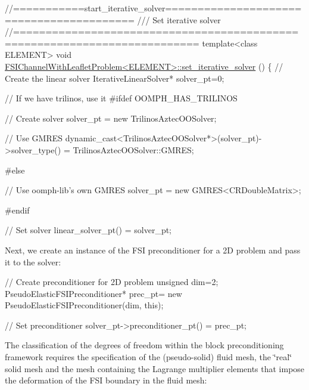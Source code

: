  
\begin{DoxyCodeInclude}
\textcolor{comment}{//===========start\_iterative\_solver=========================================}
\textcolor{comment}{/// Set iterative solver }
\textcolor{comment}{}\textcolor{comment}{//==========================================================================}
\textcolor{keyword}{template}<\textcolor{keyword}{class} ELEMENT>
\textcolor{keywordtype}{void} \hyperlink{classFSIChannelWithLeafletProblem_a8ca939c0edc4194e4e5cb7d1404f27de}{FSIChannelWithLeafletProblem<ELEMENT>::set\_iterative\_solver}
      ()
\{
 \textcolor{comment}{// Create the linear solver}
 IterativeLinearSolver* solver\_pt=0;
 
 \textcolor{comment}{// If we have trilinos, use it}
\textcolor{preprocessor}{#ifdef OOMPH\_HAS\_TRILINOS}
 
 \textcolor{comment}{// Create solver}
 solver\_pt = \textcolor{keyword}{new} TrilinosAztecOOSolver;
 
 \textcolor{comment}{// Use GMRES}
 \textcolor{keyword}{dynamic\_cast<}TrilinosAztecOOSolver*\textcolor{keyword}{>}(solver\_pt)->solver\_type() 
  = TrilinosAztecOOSolver::GMRES;
 
\textcolor{preprocessor}{#else}
 
 \textcolor{comment}{// Use oomph-lib's own GMRES}
 solver\_pt = \textcolor{keyword}{new} GMRES<CRDoubleMatrix>;
 
\textcolor{preprocessor}{#endif}

 \textcolor{comment}{// Set solver}
 linear\_solver\_pt() = solver\_pt;

\end{DoxyCodeInclude}


Next, we create an instance of the F\+SI preconditioner for a 2D problem and pass it to the solver\+:


\begin{DoxyCodeInclude}
  
 \textcolor{comment}{// Create preconditioner for 2D problem}
 \textcolor{keywordtype}{unsigned} dim=2;
 PseudoElasticFSIPreconditioner* prec\_pt=
  \textcolor{keyword}{new} PseudoElasticFSIPreconditioner(dim, \textcolor{keyword}{this});
 
 \textcolor{comment}{// Set preconditioner}
 solver\_pt->preconditioner\_pt() = prec\_pt;

\end{DoxyCodeInclude}


The classification of the degrees of freedom within the block preconditioning framework requires the specification of the (pseudo-\/solid) fluid mesh, the \char`\"{}real\char`\"{} solid mesh and the mesh containing the Lagrange multiplier elements that impose the deformation of the F\+SI boundary in the fluid mesh\+:


